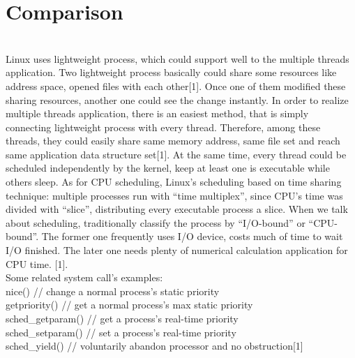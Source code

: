 \documentclass[10pt,draftclsnofoot,peerreview,letterpaper,onecolumn,]{IEEEtran}
\begin{document}
\section{Comparison}
~\\Linux uses lightweight process, which could support well to the multiple threads application. Two lightweight process basically could share some resources like address space, opened files with each other[1]. Once one of them modified these sharing resources, another one could see the change instantly. In order to realize multiple threads application, there is an easiest method, that is simply connecting lightweight process with every thread. Therefore, among these threads, they could easily share same memory address, same file set and reach same application data structure set[1]. At the same time, every thread could be scheduled independently by the kernel, keep at least one is executable while others sleep. As for CPU scheduling, Linux's scheduling based on time sharing technique: multiple processes run with “time multiplex”, since CPU's time was divided with “slice”, distributing every executable process a slice. When we talk about scheduling, traditionally classify the process by “I/O-bound” or “CPU-bound”. The former one frequently uses I/O device, costs much of time to wait I/O finished. The later one needs plenty of numerical calculation application for CPU time.
[1].
~\\Some related system call’s examples:
~\\nice()  // change a normal process’s static priority
~\\getpriority()  // get a normal process’s max static priority
~\\sched\_getparam() // get a process’s real-time priority
~\\sched\_setparam() // set a process’s real-time priority
~\\sched\_yield() // voluntarily abandon processor and no obstruction[1]
\end{document}
